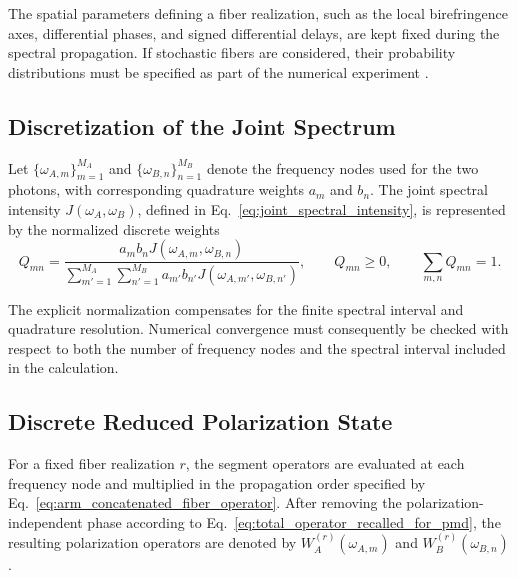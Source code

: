 The spatial parameters defining a fiber realization, such as the local
birefringence axes, differential phases, and signed differential delays, are
kept fixed during the spectral propagation. If stochastic fibers are
considered, their probability distributions must be specified as part of
the numerical experiment
\cite{foschini_poole_statistical_pmd_1991,
gordon_kogelnik_pmd_2000}.


\subsection{Discretization of the Joint Spectrum}
\label{subsec:joint_spectrum_discretization}

Let
\(\{\omega_{A,m}\}_{m=1}^{M_A}\) and
\(\{\omega_{B,n}\}_{n=1}^{M_B}\) denote the frequency nodes used for the two
photons, with corresponding quadrature weights \(a_m\) and \(b_n\).
The joint spectral intensity \(J(\omega_A,\omega_B)\), defined in
Eq.~\eqref{eq:joint_spectral_intensity}, is represented by the normalized
discrete weights
%
\begin{equation}
    Q_{mn}
    =
    \frac{
        a_m b_n
        J(\omega_{A,m},\omega_{B,n})
    }{
        \displaystyle
        \sum_{m'=1}^{M_A}
        \sum_{n'=1}^{M_B}
        a_{m'} b_{n'}
        J(\omega_{A,m'},\omega_{B,n'})
    },
    \qquad
    Q_{mn}\geq 0,
    \qquad
    \sum_{m,n}Q_{mn}=1.
    \label{eq:normalized_discrete_joint_spectral_weights}
\end{equation}

The explicit normalization compensates for the finite spectral interval and
quadrature resolution. Numerical convergence must consequently be checked
with respect to both the number of frequency nodes and the spectral interval
included in the calculation.


\subsection{Discrete Reduced Polarization State}
\label{subsec:ordered_numerical_spectral_propagation}

For a fixed fiber realization \(r\), the segment operators are evaluated at
each frequency node and multiplied in the propagation order specified by
Eq.~\eqref{eq:arm_concatenated_fiber_operator}. After removing the
polarization-independent phase according to
Eq.~\eqref{eq:total_operator_recalled_for_pmd}, the resulting polarization
operators are denoted by
\(W_A^{(r)}(\omega_{A,m})\) and
\(W_B^{(r)}(\omega_{B,n})\).

